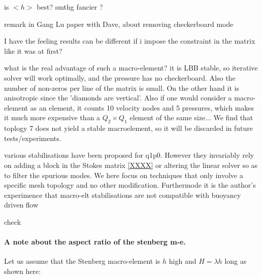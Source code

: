 is $<h>$ best? smthg fancier ?

remark in Gang Lu paper with Dave, about removing checkerboard mode

I have the feeling results can be different if i impose the
constraint in the matrix like it was at first?

what is the real advantage of such a macro-element? it is LBB stable, so 
iterative solver will work optimally, and the pressure has no checkerboard.
Also the number of non-zeros per line of the matrix is small.  
On the other hand it is anisotropic since the 'diamonds are vertical'. 
Also if one would consider a macro-element as an element, it counts 10 velocity nodes and 5 pressures, 
which makes it much more expensive than a $Q_2\times Q_1$ element of the same size...
We find that toplogy 7 does not yield a stable macroelement, so it will be discarded in 
future tests/experiments.

various stabilisations have been proposed for q1p0. However they invariably 
rely on adding a block in the Stokes matrix \ref{XXXX} or altering the 
linear solver so as to filter the spurious modes. 
We here focus on techniques that only involve a specific mesh topology and 
no other modification.
Furthermode it is the author's experimence that 
macro-elt stabilisations are not compatible with buoyancy driven flow

check \cite{nath93}


\paragraph{A note about the aspect ratio of the stenberg m-e.}
Let us assume that the Stenberg macro-element is $h$ high and $H=\lambda h$ long
as shown here:

\begin{center}
\end{center}

